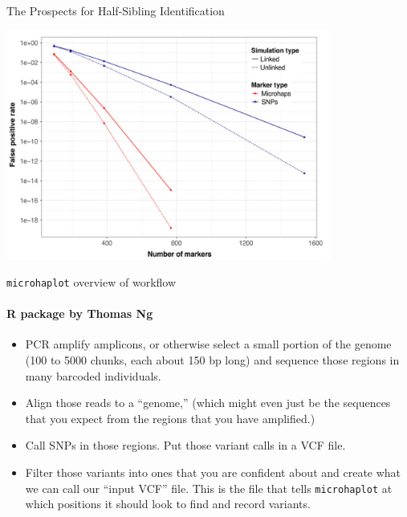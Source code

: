 \documentclass[letter,graphicx]{beamer}
\begin{document}
\begin{frame}{The Prospects for Half-Sibling Identification}
\begin{center}
\includegraphics[width = 0.8\textwidth]{../figures/linked-power.png}
\end{center}
\end{frame}





\begin{frame}{{\tt microhaplot} overview of workflow}
\framesubtitle{R package by Thomas Ng}

\begin{itemize}
\item PCR amplify amplicons, or otherwise select a small portion of the genome (100 to 5000 chunks, each about 150 bp long) and sequence those
regions in many barcoded individuals.
\item Align those reads to a ``genome,'' (which might even just be the sequences that you expect from the regions that you have amplified.)
\item Call SNPs in those regions.  Put those variant calls in a VCF file.
\item Filter those variants into ones that you are confident about and create what we can call
our ``input VCF'' file.  This is the file that tells {\tt microhaplot} at which positions it should look to
find and record variants.  

\end{itemize}
\end{frame}
\end{document}
